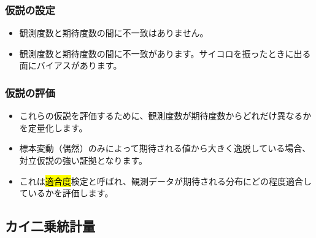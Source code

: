 
\begin{frame}
\frametitle{仮説の設定}


\begin{itemize}
\item[$H_0$:] 観測度数と期待度数の間に不一致はありません。

\item[$H_A$:] 観測度数と期待度数の間に不一致があります。サイコロを振ったときに出る面にバイアスがあります。
\end{itemize}

\end{frame}


\begin{frame}
\frametitle{仮説の評価}

\begin{itemize}

\item これらの仮説を評価するために、観測度数が期待度数からどれだけ異なるかを定量化します。

\item 標本変動（偶然）のみによって期待される値から大きく逸脱している場合、対立仮説の強い証拠となります。

\item これは\hl{適合度}検定と呼ばれ、観測データが期待される分布にどの程度適合しているかを評価します。

\end{itemize}

\end{frame}


\subsection{カイ二乗統計量}


